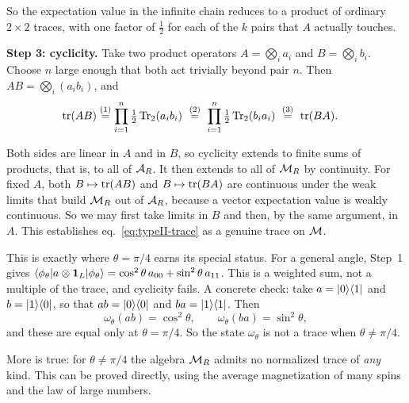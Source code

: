 So the expectation value in the infinite chain reduces to a product of ordinary $2\times2$ traces, with one
factor of $\tfrac12$ for each of the $k$ pairs that $A$ actually touches.

\textbf{Step 3: cyclicity.} Take two product operators $A=\bigotimes_i a_i$ and $B=\bigotimes_i b_i$. Choose $n$
large enough that both act trivially beyond pair $n$. Then $AB=\bigotimes_i(a_ib_i)$, and
\begin{align}
\operatorname{tr}(AB)
&\overset{(1)}{=} \prod_{i=1}^n \tfrac12\operatorname{Tr}_2(a_ib_i)
\ \overset{(2)}{=}\ \prod_{i=1}^n \tfrac12\operatorname{Tr}_2(b_ia_i)
\ \overset{(3)}{=}\ \operatorname{tr}(BA) . \notag
\end{align}
\quad
{}\quad
{}

Both sides are linear in $A$ and in $B$, so cyclicity extends to finite sums of products, that is, to all of
$\mathcal{A}_R$. It then extends to all of $\mathcal{M}_R$ by continuity. For fixed $A$, both $B\mapsto\operatorname{tr}(AB)$ and
$B\mapsto\operatorname{tr}(BA)$ are continuous under the weak limits that build $\mathcal{M}_R$ out of $\mathcal{A}_R$, because a vector
expectation value is weakly continuous. So we may first take limits in $B$ and then, by the same argument,
in $A$. This establishes eq.~\eqref{eq:typeII-trace} as a genuine trace on $\mathcal{M}$.

This is exactly where $\theta=\pi/4$ earns its special status. For a general angle, Step~1 gives
$\braket{\phi_\theta|a\otimes\mathbf{1}_L|\phi_\theta}=\cos^2\theta\,a_{00}+\sin^2\theta\,a_{11}$. This is a weighted
sum, not a multiple of the trace, and cyclicity fails. A concrete check: take
$a=\ket0\!\bra1$ and $b=\ket1\!\bra0$, so that $ab=\ket0\!\bra0$ and $ba=\ket1\!\bra1$. Then
\[
\omega_\theta(ab)=\cos^2\theta , \qquad \omega_\theta(ba)=\sin^2\theta ,
\]
and these are equal only at $\theta=\pi/4$. So the state $\omega_\theta$ is not a trace when $\theta\ne\pi/4$.

More is true: for $\theta\neq\pi/4$ the algebra $\mathcal{M}_R$ admits no normalized trace of \emph{any} kind. This can
be proved directly, using the average magnetization of many spins and the law of large numbers.

